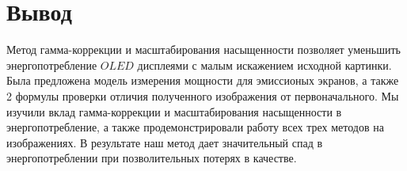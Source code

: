 \documentclass[a4paper, 12pt]{article}
\begin{document}
\newpage
\section*{Вывод}

	Метод гамма-коррекции и масштабирования насыщенности позволяет уменьшить энергопотребление $OLED$ дисплеями с малым искажением исходной картинки. Была предложена модель измерения мощности для эмиссионых экранов, а также 2 формулы проверки отличия полученного изображения от первоначального. Мы изучили вклад гамма-коррекции и масштабирования насыщенности в энергопотребление, а также продемонстрировали работу всех трех методов на изображениях. В результате наш метод дает значительный спад в энергопотреблении при позволительных потерях в качестве.
\end{document}
